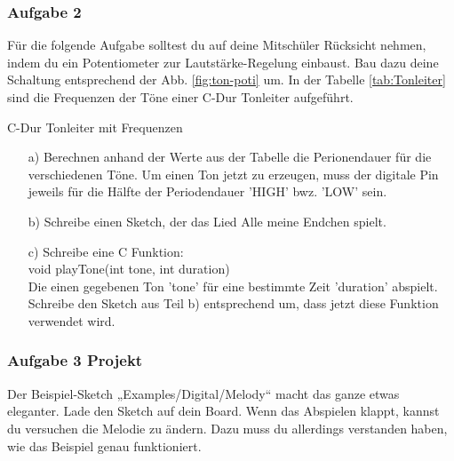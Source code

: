 \subsubsection{Aufgabe 2}
Für die folgende Aufgabe solltest du auf deine Mitschüler Rücksicht nehmen, indem du ein Potentiometer zur Lautstärke-Regelung einbaust. Bau dazu deine Schaltung entsprechend der Abb. \ref{fig:ton-poti} um. 
In der Tabelle \ref{tab:Tonleiter} sind die Frequenzen der Töne einer C-Dur Tonleiter aufgeführt.
\begin{table}[h]

\begin{center}


\end{center}
\caption{C-Dur Tonleiter mit Frequenzen }
\label{tab:Tonleiter}
\end{table}%
\begin{itemize}
  \item[a)] Berechnen anhand der Werte aus der Tabelle die Perionendauer für die verschiedenen Töne. Um einen Ton jetzt zu erzeugen, muss der digitale Pin jeweils für die Hälfte der Periodendauer 'HIGH' bwz. 'LOW' sein. 
  \item[b)] Schreibe einen Sketch, der das Lied Alle meine Endchen spielt. 
  \item[c)] Schreibe eine C Funktion: \\
  void playTone(int tone, int duration) \\
  Die einen gegebenen Ton 'tone' für eine bestimmte Zeit 'duration' abspielt. Schreibe den Sketch aus Teil b) entsprechend um, dass jetzt diese Funktion verwendet wird. 
\end{itemize}

\subsubsection{Aufgabe 3 Projekt}
 Der Beispiel-Sketch „Examples/Digital/Melody“ macht das ganze etwas eleganter. Lade den Sketch auf dein Board. Wenn das Abspielen klappt, kannst du versuchen die Melodie zu ändern. Dazu muss du allerdings verstanden haben, wie das Beispiel genau funktioniert. 

